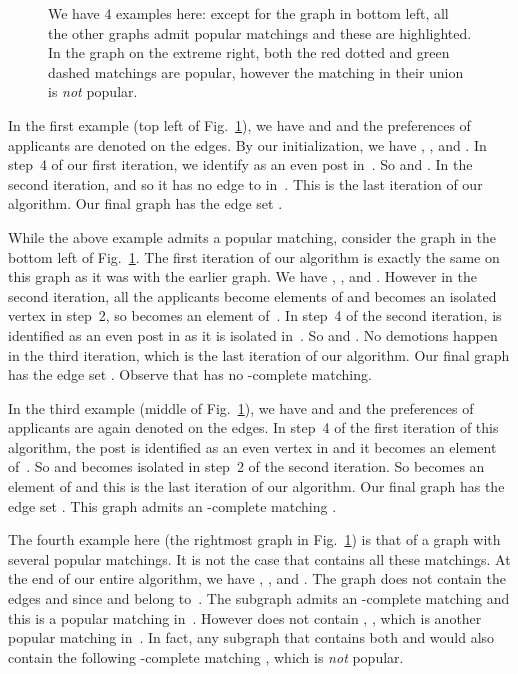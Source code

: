 \documentclass[11pt]{llncs}
\begin{document}
\begin{center}
\begin{figure}[h!]
\caption{We have 4 examples here: except for the graph in bottom left, all the other graphs admit popular matchings and these are highlighted. In the graph on the extreme right, both the red  dotted and green dashed matchings are popular, however the matching  in their union is {\em not} popular.}
\label{fig:AppA}
\end{figure}
\end{center}

In the first example (top left of Fig.~\ref{fig:AppA}), we have  and  
and the preferences of applicants are denoted on the edges.  By our initialization, we have , 
, and . In step~4 of our first iteration, we identify  as an even post in~. 
So  and . In the second iteration,  and so it has no edge to  in~. 
This is the last iteration of our algorithm. Our final graph  has the edge set 
.

While the above example admits a popular matching,
consider the graph in the bottom left of Fig.~\ref{fig:AppA}. The first iteration of our algorithm is exactly the same
on this graph as it was with the earlier graph. We have , , and .
However in the second iteration, all the applicants  become elements of  and  becomes an isolated vertex
in step~2, so  becomes an element of~. In step~4 of the second iteration,  is identified as an even post in  
as it is isolated in~.  So  and . No demotions happen in the third iteration, 
which is the last iteration of our algorithm. Our final graph  has the edge set . Observe that  has no 
-complete matching.

\smallskip

In the third example (middle of Fig.~\ref{fig:AppA}), we have  and  
and the preferences of applicants are again denoted on the edges. In step~4 of the first iteration of this algorithm, the post 
is identified as an even vertex in  and it becomes an element of~. So  and  becomes isolated in step~2 
of the second iteration. So  becomes an element of   and this is the last iteration of our algorithm. 
Our final graph  has the edge set . 
This graph admits an -complete matching .

\smallskip

The fourth example here (the rightmost graph in Fig.~\ref{fig:AppA}) is that of a  graph  with several popular matchings. 
It is not the case that  contains all these matchings.  At the end of our entire algorithm, we have , ,
and . The graph  does not contain the edges  and  since  and  belong to~. 
The subgraph  admits an -complete matching  and this is a popular matching in~.
However  does not contain , , which is another popular matching in~.
In fact, any subgraph that contains both  and  would also contain the following -complete matching
, which is {\em not} popular.
\end{document}
